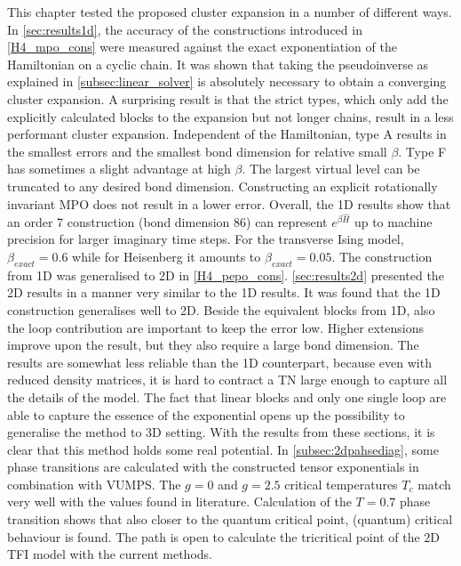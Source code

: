This chapter tested the proposed cluster expansion in a number of different ways. In \cref{sec:results1d}, the accuracy of the constructions introduced in \cref{H4_mpo_cons} were measured against the exact exponentiation of the Hamiltonian on a cyclic chain. It was shown that taking the pseudoinverse as explained in \cref{subsec:linear_solver} is absolutely necessary to obtain a converging cluster expansion.
A surprising result is that the strict types, which only add the explicitly calculated blocks to the expansion but not longer chains, result in a less performant cluster expansion. Independent of the Hamiltonian, type A results in the smallest errors and the smallest bond dimension for relative small $\beta$. Type F has sometimes a slight advantage at high $\beta$. The largest virtual level can be truncated to any desired bond dimension. Constructing an explicit rotationally invariant \Gls{MPO} does not result in a lower error.
Overall, the 1D results show that an order 7 construction (bond dimension 86) can represent  $e^{\beta \hat{H}}$ up to machine precision for larger imaginary time steps. For the transverse Ising model, $\beta_{exact} = 0.6$ while for Heisenberg it amounts to $\beta_{exact} = 0.05$.
The construction from 1D was generalised to 2D in \cref{H4_pepo_cons}. \cref{sec:results2d} presented the 2D results in a manner very similar to the 1D results. It was found that the 1D construction generalises well to 2D. Beside the equivalent blocks from 1D, also the loop contribution are important to keep the error low. Higher extensions improve upon the result, but they also require a large bond dimension. The results are somewhat less reliable than the 1D counterpart, because even with reduced density matrices, it is hard to contract a \Gls{TN} large enough to capture all the details of the model.
The fact that linear blocks and only one single loop are able to capture the essence of the exponential opens up the possibility to generalise the method to 3D setting.
With the results from these sections, it is clear that this method holds some real potential. In \cref{subsec:2dpahsediag}, some phase transitions are calculated with the constructed tensor exponentials in combination with \Gls{VUMPS}. The $g=0$ and $g=2.5$ critical temperatures $T_c$ match very well with the values found in literature. Calculation of the $T=0.7$ phase transition shows that also closer to the quantum critical point, (quantum) critical behaviour is found. The path is open to calculate the tricritical point of the 2D \Gls{TFI} model with the current methods.